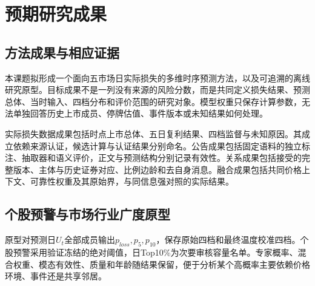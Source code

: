 \chapter{预期研究成果}
\section{方法成果与相应证据}
本课题拟形成一个面向五市场日实际损失的多维时序预测方法，以及可追溯的离线研究原型。目标成果不是一列没有来源的风险分数，而是共同定义损失结果、预测总体、当时输入、四档分布和评价范围的研究对象。模型权重只保存计算参数，无法单独回答历史上市成员、停牌估值、事件版本或未知结果如何处理。

实际损失数据成果包括时点上市总体、五日复利结果、四档监督与未知原因。其成立依赖来源认证，候选计算与认证结果分别命名。公告成果包括固定语料的独立标注、抽取器和语义评价，正文与预测结构分别记录有效性。关系成果包括接受的完整版本、主体与历史证券对应、比例边龄和去自身消息。融合成果包括共同价格上下文、可靠性权重及其原始界，与同信息强对照的实际结果。


\section{个股预警与市场行业广度原型}
原型对预测日$U_t$全部成员输出$p_{loss},p_5,p_{10}$，保存原始四档和最终温度校准四档。个股预警采用验证冻结的绝对阈值，日Top10\%为次要审核容量名单。专家概率、混合权重、模态有效性、质量和年龄随结果保留，便于分析某个高概率主要依赖价格环境、事件还是共享邻居。


